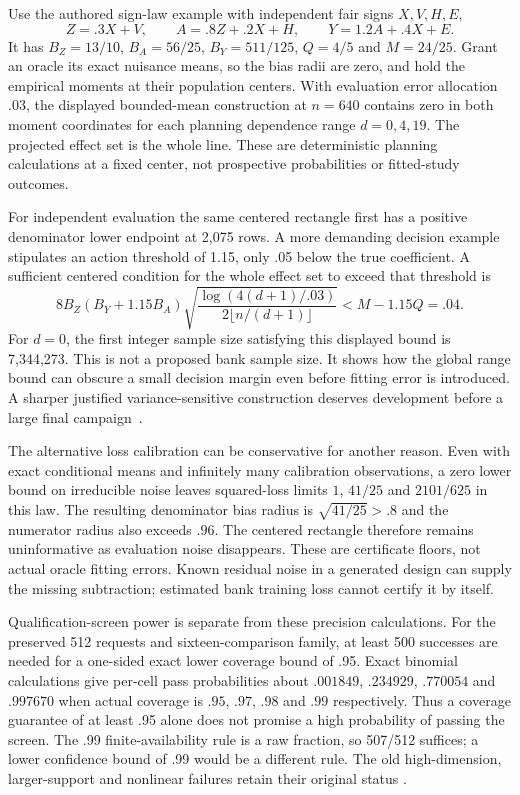 Use the authored sign-law example with independent fair signs
$X,V,H,E$,
\[
 Z=.3X+V,\qquad A=.8Z+.2X+H,\qquad Y=1.2A+.4X+E.
\]
It has $B_Z=13/10$, $B_A=56/25$, $B_Y=511/125$, $Q=4/5$ and
$M=24/25$. Grant an oracle its exact nuisance means, so the bias
radii are zero, and hold the empirical moments at their population
centers. With evaluation error allocation $.03$, the displayed
bounded-mean construction at $n=640$ contains zero in both moment
coordinates for each planning dependence range $d=0,4,19$.
The projected effect set is the whole line. These are deterministic
planning calculations at a fixed center, not prospective probabilities
or fitted-study outcomes.

For independent evaluation the same centered rectangle first has
a positive denominator lower endpoint at 2,075 rows. A more demanding
decision example stipulates an action threshold of 1.15, only .05
below the true coefficient. A sufficient centered condition for
the whole effect set to exceed that threshold is
\[
 8B_Z(B_Y+1.15B_A)
 \sqrt{\frac{\log(4(d+1)/.03)}{2\lfloor n/(d+1)\rfloor}}
 <M-1.15Q=.04.
\]
For $d=0$, the first integer sample size satisfying this displayed
bound is 7,344,273. This is not a proposed bank sample size. It
shows how the global range bound can obscure a small decision
margin even before fitting error is introduced. A sharper justified
variance-sensitive construction deserves development before a large
final campaign~\citep{exec13_ivrd_dependent}.

The alternative loss calibration can be conservative for another
reason. Even with exact conditional means and infinitely many
calibration observations, a zero lower bound on irreducible noise
leaves squared-loss limits $1$, $41/25$ and $2101/625$ in this law.
The resulting denominator bias radius is $\sqrt{41/25}>.8$ and
the numerator radius also exceeds $.96$. The centered rectangle
therefore remains uninformative as evaluation noise disappears.
These are certificate floors, not actual oracle fitting errors.
Known residual noise in a generated design can supply the missing
subtraction; estimated bank training loss cannot certify it by itself.

Qualification-screen power is separate from these precision calculations.
For the preserved 512 requests and sixteen-comparison family, at
least 500 successes are needed for a one-sided exact lower coverage
bound of .95. Exact binomial calculations give per-cell pass
probabilities about $.001849$, $.234929$, $.770054$ and $.997670$
when actual coverage is $.95$, $.97$, $.98$ and $.99$ respectively.
Thus a coverage guarantee of at least .95 alone does not promise
a high probability of passing the screen. The .99 finite-availability
rule is a raw fraction, so 507/512 suffices; a lower confidence
bound of .99 would be a different rule. The old high-dimension,
larger-support and nonlinear failures retain their original status
\citep{exec13_ivrd_dependent}.


